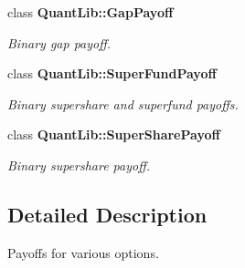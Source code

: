 \begin{DoxyCompactItemize}
class {\bf Quant\+Lib\+::\+Gap\+Payoff}
\begin{DoxyCompactList}\small\item\em Binary gap payoff. \end{DoxyCompactList}\item 
class {\bf Quant\+Lib\+::\+Super\+Fund\+Payoff}
\begin{DoxyCompactList}\small\item\em Binary supershare and superfund payoffs. \end{DoxyCompactList}\item 
class {\bf Quant\+Lib\+::\+Super\+Share\+Payoff}
\begin{DoxyCompactList}\small\item\em Binary supershare payoff. \end{DoxyCompactList}\end{DoxyCompactItemize}


\subsection{Detailed Description}
Payoffs for various options. 

